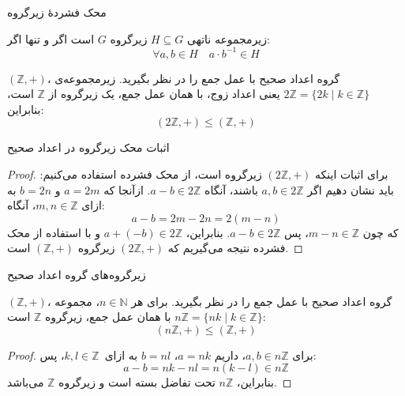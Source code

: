 \begin{frame}[t]{محک فشردهٔ زیرگروه}
    \begin{theorem}

        زیرمجموعه ناتهی \( H \subseteq G \) زیرگروه \( G \) است اگر و تنها اگر:
        \[
            \forall a, b \in H \quad a \cdot b^{-1} \in H
        \]
    \end{theorem}
    \begin{example}
        \( (\mathbb{Z}, +) \)، گروه اعداد صحیح با عمل جمع را در نظر بگیرید.
        زیرمجموعه‌ی \( 2\mathbb{Z} = \{ 2k \mid k \in \mathbb{Z} \} \) یعنی اعداد زوج، با همان عمل جمع، یک زیرگروه از \( \mathbb{Z} \) است، بنابراین:
        \[
            (2\mathbb{Z}, +) \leq (\mathbb{Z}, +)
        \]
    \end{example}

    \end{frame}

\begin{frame}[t]{اثبات محک زیرگروه در اعداد صحیح}
    \begin{proof}
        برای اثبات اینکه \( (2\mathbb{Z}, +) \) زیرگروه است، از محک فشرده استفاده می‌کنیم:
        باید نشان دهیم اگر \( a, b \in 2\mathbb{Z} \) باشند، آنگاه \( a - b \in 2\mathbb{Z} \).
        ازآنجا که \( a = 2m \) و \( b = 2n \)  به ازای \( m, n \in \mathbb{Z} \)، آنگاه:
        \[
            a - b = 2m - 2n = 2(m - n)
        \]
        که چون \( m - n \in \mathbb{Z} \)، پس \( a - b \in 2\mathbb{Z} \).
        بنابراین، \( a + (-b) \in 2\mathbb{Z} \) و با استفاده از محک فشرده نتیجه می‌گیریم که \( (2\mathbb{Z}, +) \) زیرگروه \( (\mathbb{Z}, +) \) است.
    \end{proof}
\end{frame}



\begin{frame}[t]{زیرگروه‌های گروه اعداد صحیح}
    \begin{example}
        \( (\mathbb{Z}, +) \)، گروه اعداد صحیح با عمل جمع را در نظر بگیرید.
        برای هر \( n \in \mathbb{N} \)، مجموعه \( n\mathbb{Z} = \{ nk \mid k \in \mathbb{Z} \} \) با همان عمل جمع، زیرگروه \( \mathbb{Z} \) است:
        \[
            (n\mathbb{Z}, +) \leq (\mathbb{Z}, +)
        \]
    \end{example}

    \begin{proof}
        برای \( a, b \in n\mathbb{Z} \)، داریم \( a = nk \)، \( b = nl \)  به ازای \( k, l \in \mathbb{Z} \)، پس:
        \[
            a - b = nk - nl = n(k - l) \in n\mathbb{Z}
        \]
        بنابراین، \( n\mathbb{Z} \) تحت تفاضل بسته است و زیرگروه \( \mathbb{Z} \) می‌باشد.
    \end{proof}
\end{frame}

